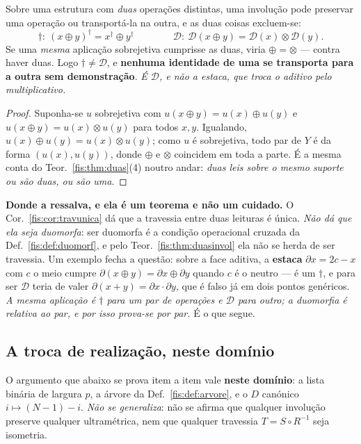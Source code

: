 \documentclass[livro.tex]{subfiles}
\begin{document}
\begin{teorema}\label{fis:thm:duasinvol}
Sobre uma estrutura com \emph{duas} operações distintas, uma involução pode
preservar uma operação ou transportá-la na outra, e as duas coisas excluem-se:
\[
\dagger\colon\ (x\oplus y)^{\dagger}=x^{\dagger}\oplus y^{\dagger}
\qquad\qquad
\mathcal{D}\colon\ \mathcal{D}(x\oplus y)=\mathcal{D}(x)\otimes\mathcal{D}(y) .
\]
Se uma \emph{mesma} aplicação sobrejetiva cumprisse as duas, viria
$\oplus=\otimes$ --- contra haver duas. Logo $\dagger\neq\mathcal{D}$, e
\textbf{nenhuma identidade de uma se transporta para a outra sem demonstração}.
\emph{É $\mathcal{D}$, e não a estaca, que troca o aditivo pelo multiplicativo.}
\end{teorema}

\begin{proof}
Suponha-se $u$ sobrejetiva com $u(x\oplus y)=u(x)\oplus u(y)$ e
$u(x\oplus y)=u(x)\otimes u(y)$ para todos $x,y$. Igualando,
$u(x)\oplus u(y)=u(x)\otimes u(y)$; como $u$ é sobrejetiva, todo par de $Y$ é da
forma $(u(x),u(y))$, donde $\oplus$ e $\otimes$ coincidem em toda a parte. É a
mesma conta do Teor.~\ref{fis:thm:duas}(4) noutro andar: \emph{duas leis sobre o
mesmo suporte ou são duas, ou são uma}.
\end{proof}

\medskip\noindent\textbf{Donde a ressalva, e ela é um teorema e não um cuidado.}
O Cor.~\ref{fis:cor:travunica} dá que a travessia entre duas leituras é única.
\emph{Não dá que ela seja duomorfa}: ser duomorfa é a condição operacional
cruzada da Def.~\ref{fis:def:duomorf}, e pelo Teor.~\ref{fis:thm:duasinvol} ela
não se herda de ser travessia. Um exemplo fecha a questão: sobre a face aditiva,
a \textbf{estaca} $\partial x=2c-x$ com $c$ o meio cumpre
$\partial(x\oplus y)=\partial x\oplus\partial y$ quando $c$ é o neutro --- é um
$\dagger$, e para ser $\mathcal{D}$ teria de valer $\partial(x+y)=\partial x\cdot\partial y$,
que é falso já em dois pontos genéricos. \emph{A mesma aplicação é $\dagger$ para
um par de operações e $\mathcal{D}$ para outro; a duomorfia é relativa ao par, e
por isso prova-se por par.} É o que segue.

\subsection*{A troca de realização, neste domínio}

\noindent O argumento que abaixo se prova item a item vale \textbf{neste
domínio}: a lista binária de largura $p$, a árvore da Def.~\ref{fis:def:arvore},
e o $D$ canónico $i\mapsto(N-1)-i$. \emph{Não se generaliza}: não se
afirma que qualquer involução preserve qualquer ultramétrica, nem que qualquer
travessia $T=S\circ R^{-1}$ seja isometria.
\end{document}
